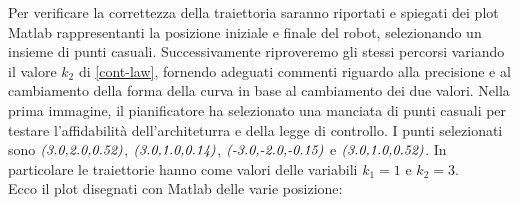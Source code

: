 \documentclass[a4paper,11 pt,oneside]{book}
\theoremstyle{definition}
\begin{document}
\vspace{6cm}
Per verificare la correttezza della traiettoria saranno riportati e spiegati dei plot Matlab rappresentanti la posizione iniziale e finale del robot, selezionando un insieme di punti casuali.
Successivamente riproveremo gli stessi percorsi variando il valore $k_2$ di \eqref{cont-law}, fornendo adeguati commenti riguardo alla precisione e al cambiamento della forma della curva in base al cambiamento dei due valori.
Nella prima immagine, il pianificatore ha selezionato una manciata di punti casuali per testare l'affidabilità dell'architeturra e della legge di controllo. 
I punti selezionati sono $\emph{(3.0,2.0,0.52)}$, $ \emph{(3.0,1.0,0.14)}$, $\emph{(-3.0,-2.0,-0.15)}$  e $\emph{(3.0,1.0,0.52)}$. In particolare le traiettorie hanno come valori delle variabili $k_1=1$ e $ k_2=3$.
\\
Ecco il plot disegnati con Matlab delle varie posizione:
\end{document}
